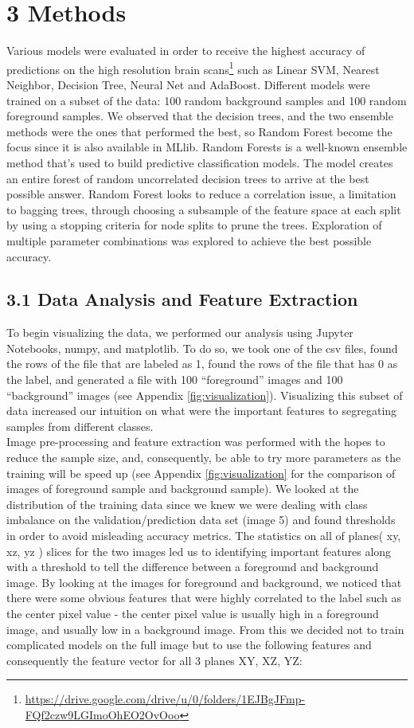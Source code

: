 \documentclass{neu_handout}
\begin{document}
\section*{3 Methods}
Various models were evaluated in order to receive the highest accuracy of predictions on the high resolution brain scans\footnote{\url{https://drive.google.com/drive/u/0/folders/1EJBgJFmp-FQf2czw9LGImoOhEO2OvOoo}} such as Linear SVM, Nearest Neighbor, Decision Tree, Neural Net and AdaBoost. Different models were trained on a subset of the data: 100 random background samples and 100 random foreground samples. We observed that the decision trees, and the two ensemble methods were the ones that performed the best, so Random Forest become the focus since it is also available in MLlib. Random Forests is a well-known ensemble method that's used to build predictive classification models. The model creates an entire forest of random uncorrelated decision trees to arrive at the best possible answer. Random Forest looks to reduce a correlation issue, a limitation to bagging trees, through choosing a subsample of the feature space at each split by using a stopping criteria for node splits to prune the trees. Exploration of multiple parameter combinations was explored to achieve the best possible accuracy. \\

\subsection*{3.1 Data Analysis and Feature Extraction}
To begin visualizing the data, we performed our analysis using Jupyter Notebooks, numpy, and matplotlib. To do so, we took one of the csv files, found the rows of the file that are labeled as 1, found the rows of the file that has 0 as the label, and generated a file with 100 ``foreground'' images and 100 ``background'' images (see Appendix \ref{fig:visualization}). Visualizing this subset of data increased our intuition on what were the important features to segregating samples from different classes.\\

Image pre-processing and feature extraction was performed with the hopes to reduce the sample size, and, consequently, be able to try more parameters as the training will be speed up (see Appendix \ref{fig:visualization} for the comparison of images of foreground sample and background sample). We looked at the distribution of the training data since we knew we were dealing with class imbalance on the validation/prediction data set (image 5) and found thresholds in order to avoid misleading accuracy metrics. The statistics on all of planes( xy, xz, yz ) slices for the two images led us to identifying important features along with a threshold to tell the difference between a foreground and background image. By looking at the images for foreground and background, we noticed that there were some obvious features that were highly correlated to the label such as the center pixel value - the center pixel value is usually high in a foreground image, and usually low in a background image. From this we decided not to train complicated models on the full image but to use the following features and consequently the feature vector for all 3 planes XY, XZ, YZ:
\end{document}
